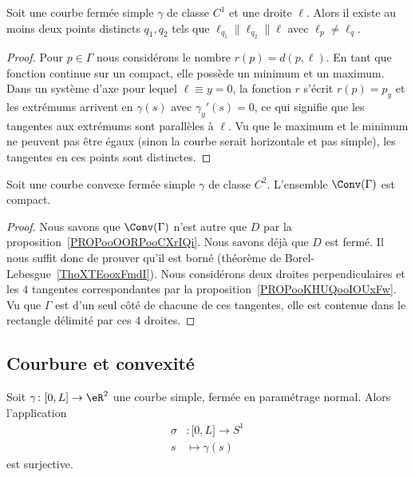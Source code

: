 \begin{proposition}     \label{PROPooKHUQooIOUxFw}
	Soit une courbe fermée simple \( \gamma\) de classe \( C^1\) et une droite \( \ell\). Alors il existe au moins deux points distincts \( q_1,q_2\) tels que \( \ell_{q_1}\parallel \ell_{q_2}\parallel\ell\) avec \( \ell_p\neq \ell_q\).
\end{proposition}

\begin{proof}
	Pour \( p\in \Gamma\) nous considérons le nombre \( r(p)=d(p,\ell)\). En tant que fonction continue sur un compact, elle possède un minimum et un maximum. Dans un système d'axe pour lequel \( \ell\equiv y=0\), la fonction \( r\) s'écrit \( r(p)=p_y\) et les extrémums arrivent en \( \gamma(s)\) avec \( \gamma_y'(s)=0\), ce qui signifie que les tangentes aux extrémums sont parallèles à \( \ell\). Vu que le maximum et le minimum ne peuvent pas être égaux (sinon la courbe serait horizontale et pas simple), les tangentes en ces points sont distinctes.
\end{proof}

\begin{corollary}
	Soit une courbe convexe fermée simple \( \gamma\) de classe \( C^2\). L'ensemble \( \Conv(\Gamma)\) est compact.
\end{corollary}

\begin{proof}
	Nous savons que \( \Conv(\Gamma)\) n'est autre que \( D\) par la proposition~\ref{PROPooOORPooCXrIQi}. Nous savons déjà que \( D\) est fermé. Il nous suffit donc de prouver qu'il est borné (théorème de Borel-Lebesgue~\ref{ThoXTEooxFmdI}). Nous considérons deux droites perpendiculaires et les \( 4\) tangentes correspondantes par la proposition~\ref{PROPooKHUQooIOUxFw}. Vu que \( \Gamma\) est d'un seul côté de chacune de ces tangentes, elle est contenue dans le rectangle délimité par ces \( 4\) droites.
\end{proof}

\subsection{Courbure et convexité}
\label{SUBSECooNJOLooYuGRjA}

\begin{lemma}       \label{LEMooHMFSooFlhanD}
	Soit \(   \gamma\colon \mathopen[ 0 , L \mathclose]\to \eR^2    \) une courbe simple, fermée en paramétrage normal. Alors l'application
	\begin{equation}
		\begin{aligned}
			\sigma & \colon \mathopen[ 0 , L \mathclose]\to S^1 \\
			s      & \mapsto \gamma(s)
		\end{aligned}
	\end{equation}
	est surjective.
\end{lemma}

